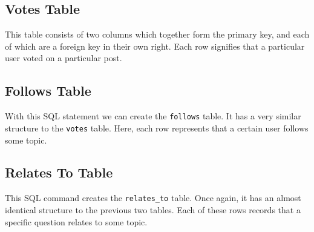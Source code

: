 \subsection{Votes Table}

This table consists of two columns which together form the primary key, and each of which are a foreign key in their own right. Each row signifies that a particular user voted on a particular post.


\subsection{Follows Table}

With this SQL statement we can create the \verb`follows` table. It has a very similar structure to the \verb`votes` table. Here, each row represents that a certain user follows some topic.


\subsection{Relates To Table}

This SQL command creates the \verb`relates_to` table. Once again, it has an almost identical structure to the previous two tables. Each of these rows records that a specific question relates to some topic.


